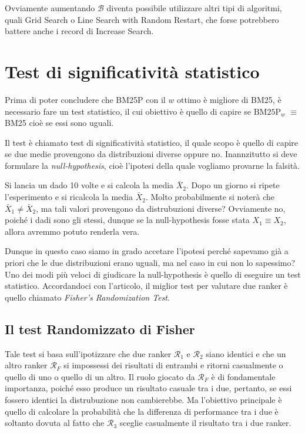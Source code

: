Ovviamente aumentando $\mathcal{B}$ diventa possibile utilizzare altri
tipi di algoritmi, quali Grid Search o Line Search with Random Restart, che
forse potrebbero battere anche i record di Increase Search.

\section{Test di significatività statistico}

Prima di poter concludere che BM25P con il $w$ ottimo è migliore di BM25, è necessario
fare un test statistico, il cui obiettivo è quello di capire se $\text{BM25P}_w$ $\equiv$ BM25
cioè se essi sono uguali.

Il test è chiamato test di significatività statistico, il quale scopo
è quello di capire se due medie provengono da distribuzioni diverse oppure no.
Inannzitutto si deve formulare la \textit{null-hypothesis}, cioè l'ipotesi
della quale vogliamo provarne la falsità.

\begin{esempio}
	Si lancia un dado 10 volte e si calcola la media $\bar{X}_2$. Dopo un giorno si ripete l'esperimento
	e si ricalcola la media $\bar{X}_2$. Molto probabilmente si noterà che $\bar{X}_1 \neq \bar{X}_2$,
	ma tali valori provengono da distrubuzioni diverse?
	Ovviamente no, poiché i dadi sono gli stessi, dunque se la null-hypothesis fosse
	stata $X_1 \equiv X_2$, allora avremmo potuto renderla vera.
\end{esempio}

Dunque in questo caso siamo in grado accetare l'ipotesi perché
sapevamo già a priori che le due distribuzioni erano uguali, ma nel caso
in cui non lo sapessimo?
Uno dei modi più veloci di giudicare la null-hypothesis è quello di eseguire un test statistico.
Accordandoci con l'articolo\cite{10.1145/1321440.1321528}, il miglior test per valutare
due ranker è quello chiamato \textit{Fisher's Randomization Test}.

\subsection{Il test Randomizzato di Fisher}
Tale test si basa sull'ipotizzare che due ranker $\mathcal{R}_1 $ e $\mathcal{R}_2$ siano identici
e che un altro ranker $\mathcal{R}_F$ si impossessi dei risultati di entrambi e
ritorni casualmente o quello di uno o quello di un altro.
Il ruolo giocato da $\mathcal{R}_F$ è di fondamentale importanza, poiché esso produce un risultato
casuale tra i due, pertanto, se essi fossero identici la distrubuzione non cambierebbe.
Ma l'obiettivo principale è quello di calcolare la probabilità che la differenza
di performance tra i due è soltanto dovuta al fatto che $\mathcal{R}_3$ sceglie casualmente
il risultato tra i due ranker.

